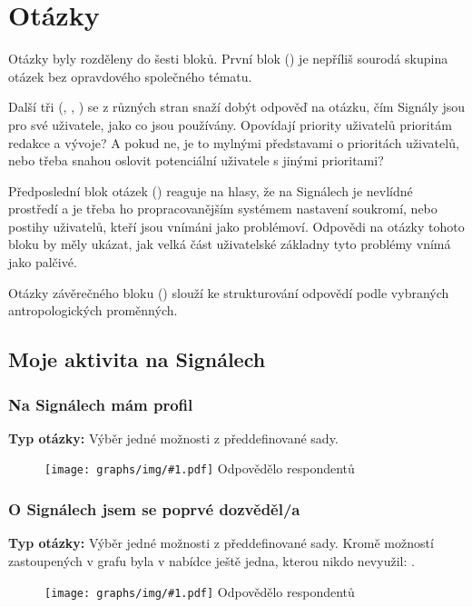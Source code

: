 \documentclass[12pt, a4paper, twoside]{article}
\newcommand{\answercount}[1]{Odpovědělo  respondentů}
\newcommand{\includegraph}[2]{
  \begin{figure}[H]
    \centering
    \textbf{#2}
    \texttt{[image: graphs/img/\#1.pdf]}
    \answercount{#1}
  \end{figure}
}
\newcommand{\qtype}{\textbf{Typ otázky:}
}
\newcommand{\pickOne}{Výběr jedné možnosti z předdefinované sady}
\begin{document}
\section{Otázky}

Otázky byly rozděleny do šesti bloků.
První blok ()
je nepříliš sourodá skupina otázek bez opravdového společného tématu.

Další tři
(, , )
se z různých stran snaží dobýt odpověď na otázku, čím Signály jsou
pro své uživatele, jako co jsou používány.
Opovídají priority uživatelů prioritám redakce a vývoje?
A pokud ne, je to mylnými představami o prioritách uživatelů,
nebo třeba snahou oslovit potenciální uživatele s jinými prioritami?

Předposlední blok otázek ()
reaguje na hlasy, že na Signálech je nevlídné prostředí
a je třeba ho  propracovanějším systémem nastavení
soukromí, nebo postihy uživatelů, kteří jsou vnímáni jako problémoví.
Odpovědi na otázky tohoto bloku by měly ukázat, jak velká část
uživatelské základny tyto problémy vnímá jako palčivé.

Otázky závěrečného bloku ()
slouží ke strukturování odpovědí
podle vybraných antropologických proměnných.

\vfill

\subsection{Moje aktivita na Signálech}\label{sec:mojeaktivita}

\subsubsection{Na Signálech mám profil}

\qtype \pickOne.

\includegraph{na_signalech_mam_profil}{}

\subsubsection{O Signálech jsem se poprvé dozvěděl/a}

\qtype \pickOne.
Kromě možností zastoupených v grafu byla v nabídce ještě jedna,
kterou nikdo nevyužil: .

\includegraph{o_signalech_jsem_se_poprve_dozvedel}{}
\end{document}
